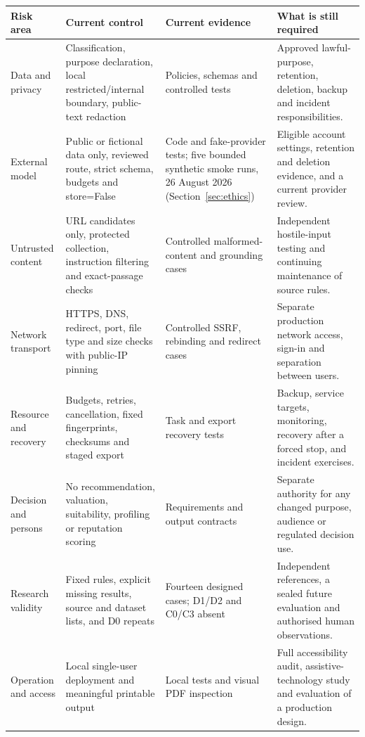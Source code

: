 \clearpage
\begin{table}[p]
  \centering
  \scriptsize
  \setlength{\tabcolsep}{4pt}
  \renewcommand{\arraystretch}{1.08}
  \begin{tabularx}{\textwidth}{@{}P{0.17\textwidth}P{0.26\textwidth}P{0.24\textwidth}Y@{}}
    \toprule
    \textbf{Risk area} & \textbf{Current control} & \textbf{Current evidence} & \textbf{What is still required} \\
    \midrule
    Data and privacy & Classification, purpose declaration, local restricted/internal boundary, public-text redaction & Policies, schemas and controlled tests & Approved lawful-purpose, retention, deletion, backup and incident responsibilities. \\
    External model & Public or fictional data only, reviewed route, strict schema, budgets and \textnormal{store=False} & Code and fake-provider tests; five bounded synthetic smoke runs, 26 August 2026 (Section~\ref{sec:ethics}) & Eligible account settings, retention and deletion evidence, and a current provider review. \\
    Untrusted content & URL candidates only, protected collection, instruction filtering and exact-passage checks & Controlled malformed-content and grounding cases & Independent hostile-input testing and continuing maintenance of source rules. \\
    Network transport & HTTPS, DNS, redirect, port, file type and size checks with public-IP pinning & Controlled SSRF, rebinding and redirect cases & Separate production network access, sign-in and separation between users. \\
    Resource and recovery & Budgets, retries, cancellation, fixed fingerprints, checksums and staged export & Task and export recovery tests & Backup, service targets, monitoring, recovery after a forced stop, and incident exercises. \\
    Decision and persons & No recommendation, valuation, suitability, profiling or reputation scoring & Requirements and output contracts & Separate authority for any changed purpose, audience or regulated decision use. \\
    Research validity & Fixed rules, explicit missing results, source and dataset lists, and D0 repeats & Fourteen designed cases; D1/D2 and C0/C3 absent & Independent references, a sealed future evaluation and authorised human observations. \\
    Operation and access & Local single-user deployment and meaningful printable output & Local tests and visual PDF inspection & Full accessibility audit, assistive-technology study and evaluation of a production design. \\
    \bottomrule
  \end{tabularx}


\end{table}
